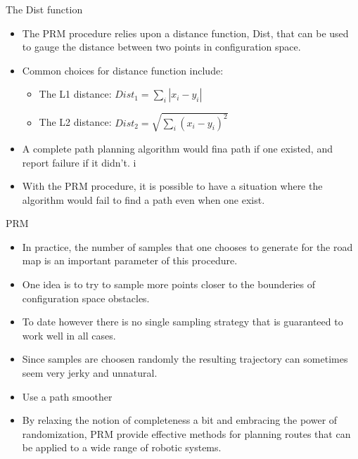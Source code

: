 \documentclass[10pt,mathserif]{beamer}
\begin{document}
\begin{frame}{The Dist function}
\begin{itemize}
\item The PRM procedure relies upon a distance function, Dist, that can be used to gauge the distance between two points in configuration space.
\item Common choices for distance function include:
\begin{itemize}
\item The L1 distance: $Dist_1 = \sum_{i}|x_i - y_i| $
\item The L2 distance: $Dist_2 =  \sqrt{\sum_{i}(x_i - y_i)^2}$
\end{itemize}
\item A complete path planning algorithm would fina path if one existed, and report failure if it didn't. 
i\item With the PRM procedure, it is possible to have a situation where the algorithm would fail to find a path even when one exist.
\end{itemize}
\end{frame}

\begin{frame}{PRM}
\begin{itemize}
\item In practice, the number of samples that one chooses to generate for the road map is an 
important parameter of this procedure. 
\item One idea is to try to sample more points closer to the bounderies of configuration space 
obstacles.
\item To date however there is no single sampling strategy that is guaranteed to work well in all 
cases.
\item Since samples are choosen randomly the resulting trajectory can sometimes seem very jerky and
unnatural.
\item Use a path smoother
\item By relaxing the notion of completeness a bit and embracing the power of randomization, PRM 
provide effective methods for planning routes that can be applied to a wide range of robotic systems.
\end{itemize}
\end{frame}
\end{document}
